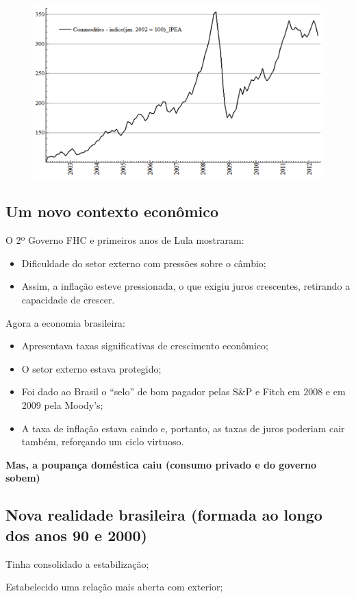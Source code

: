 \documentclass[a4paper,12pt]{article}[abntex2]
\begin{document}
\begin{figure}[H]
    \centering
    \includegraphics[width=0.7\linewidth]{Imagens/a16i8.png}
\end{figure}

\subsection{\textbf{Um novo contexto econômico}}
O 2º Governo FHC e primeiros anos de Lula mostraram:
\begin{itemize}
    \item Dificuldade do setor externo com pressões sobre o câmbio;
    \item Assim, a inflação esteve pressionada, o que exigiu juros crescentes, retirando a capacidade de crescer.
\end{itemize}

Agora a economia brasileira:
\begin{itemize}
    \item Apresentava taxas significativas de crescimento econômico;
    \item O setor externo estava protegido;
    \item Foi dado ao Brasil o ``selo'' de bom pagador pelas S\&P e Fitch em 2008 e em 2009 pela Moody’s;
    \item A taxa de inflação estava caindo e, portanto, as taxas de juros poderiam cair também, reforçando um ciclo virtuoso.
\end{itemize}

\textbf{Mas, a poupança doméstica caiu (consumo privado e do governo sobem)}

\subsection{\textbf{Nova realidade brasileira (formada ao longo dos anos 90 e 2000)}}
Tinha consolidado a estabilização;

Estabelecido uma relação mais aberta com exterior;
\end{document}
